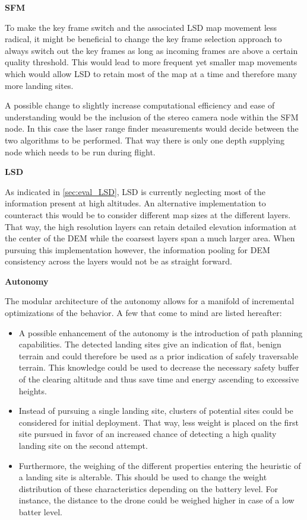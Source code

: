 \textbf{SFM}

To make the key frame switch and the associated LSD map movement less radical, it might be beneficial to change the key frame selection approach to always switch out the key frames as long as incoming frames are above a certain quality threshold. This would lead to more frequent yet smaller map movements which would allow LSD to retain most of the map at a time and therefore many more landing sites.

A possible change to slightly increase computational efficiency and ease of understanding would be the inclusion of the stereo camera node within the SFM node. In this case the laser range finder measurements would decide between the two algorithms to be performed. That way there is only one depth supplying node which needs to be run during flight.

\textbf{LSD}

As indicated in \cref{sec:eval_LSD}, LSD is currently neglecting most of the information present at high altitudes. An alternative implementation to counteract this would be to consider different map sizes at the different layers. That way, the high resolution layers can retain detailed elevation information at the center of the DEM while the coarsest layers span a much larger area. When pursuing this implementation however, the information pooling for DEM consistency across the layers would not be as straight forward.

\textbf{Autonomy}

The modular architecture of the autonomy allows for a manifold of incremental optimizations of the behavior. A few that come to mind are listed hereafter:

\begin{itemize}
    \item A possible enhancement of the autonomy is the introduction of path planning capabilities. The detected landing sites give an indication of flat, benign terrain and could therefore be used as a prior indication of safely traversable terrain. This knowledge could be used to decrease the necessary safety buffer of the clearing altitude and thus save time and energy ascending to excessive heights.
    \item Instead of pursuing a single landing site, clusters of potential sites could be considered for initial deployment. That way, less weight is placed on the first site pursued in favor of an increased chance of detecting a high quality landing site on the second attempt.
    \item Furthermore, the weighing of the different properties entering the heuristic of a landing site is alterable. This should be used to change the weight distribution of these characteristics depending on the battery level. For instance, the distance to the drone could be weighed higher in case of a low batter level.
\end{itemize}












